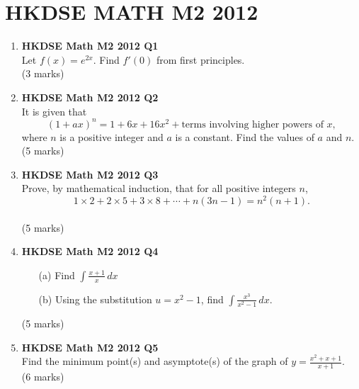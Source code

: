 \documentclass{report}
\begin{document}
\begin{enumerate}
\end{enumerate}

\chapter{HKDSE MATH M2 2012}
\begin{enumerate}
	\item \textbf{HKDSE Math M2 2012 Q1}\\
	Let $f(x) = e^{2x}$. Find $f'(0)$ from first principles. \\(3 marks)

	\item \textbf{HKDSE Math M2 2012 Q2}\\
	It is given that 
	$$(1+ax)^n = 1 + 6x + 16x^2 +\text{terms involving higher powers of }x,$$
	where $n$ is a positive integer and $a$ is a constant. Find the values of $a$ and $n$.\\(5 marks)

	\item \textbf{HKDSE Math M2 2012 Q3}\\
	Prove, by mathematical induction, that for all positive integers $n$,
		$$\displaystyle 1 \times 2 + 2 \times 5 + 3 \times 8 + \cdots + n(3n-1) = n^2(n+1).$$ \\(5 marks)

	\item \textbf{HKDSE Math M2 2012 Q4}
	\begin{enumerate}
		\item [(a)]Find $\displaystyle\int \frac{x+1}{x}\,dx$
		\item [(b)]Using the substitution $u = x^2-1$, find $\displaystyle\int\frac{x^3}{x^2 - 1}\,dx$.
	\end{enumerate}
	(5 marks)

	\item \textbf{HKDSE Math M2 2012 Q5}\\
	Find the minimum point(s) and asymptote(s) of the graph of $\displaystyle y = \frac{x^2+x+1}{x+1}$. \\(6 marks)

	\newpage


\end{enumerate}
\end{document}
